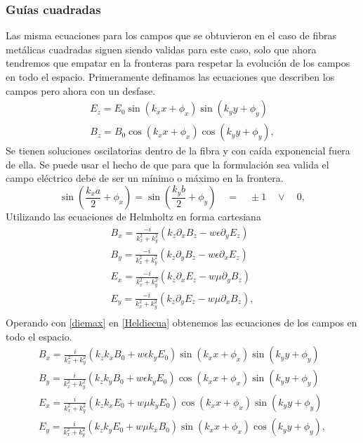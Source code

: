 \subsubsection{Guías cuadradas}
Las misma ecuaciones para los campos que se obtuvieron en el caso de fibras metálicas cuadradas siguen siendo validas para este caso, solo que ahora tendremos que empatar en la fronteras para respetar la evolución de los campos en todo el espacio. Primeramente definamos las ecuaciones que describen los campos pero ahora con un desfase.
\begin{eqnarray}\label{diemax}
E_{z}=E_{0} \sin(k_{x}x+\phi_{x}) \sin(k_{y}y+\phi_{y}) \\
B_{z}=B_{0} \cos(k_{x}x+\phi_{x}) \cos(k_{y}y+\phi_{y}) ,
\end{eqnarray}
Se tienen soluciones oscilatorias dentro de la fibra y con caída exponencial fuera de ella. Se puede usar el hecho de que para que la formulación sea valida el campo eléctrico debe de ser un mínimo o máximo en la frontera.
\begin{equation}
	\sin(\frac{k_{x}a}{2}+\phi_{x})=\sin(\frac{k_{y}b}{2}+\phi_{y}) \quad = \quad \pm 1 \quad \vee \quad 0 ,
\end{equation}
Utilizando las ecuaciones de Helmholtz en forma cartesiana
\begin{eqnarray} \label{Heldiecua}
B_{x}=\frac{-i}{k_{x}^2+k_{y}^2}(k_{z}\partial_{x}B_{z}-w \epsilon \partial_{y}E_{z}) \\
B_{y}=\frac{-i}{k_{x}^2+k_{y}^2}(k_{z}\partial_{y}B_{z}-w \epsilon \partial_{x}E_{z}) \\
E_{x}=\frac{-i}{k_{x}^2+k_{y}^2}(k_{z}\partial_{x}E_{z}-w \mu \partial_{y}B_{z}) \\
E_{y}=\frac{-i}{k_{x}^2+k_{y}^2}(k_{z}\partial_{y}E_{z}-w \mu \partial_{x}B_{z}) , \\
\end{eqnarray}
Operando con \ref{diemax} en \ref{Heldiecua} obtenemos las ecuaciones de los campos en todo el espacio.
\begin{eqnarray}
B_{x}=\frac{i}{k_{x}^2+k_{y}^2}(k_{z}k_{x}B_{0}+w\epsilon k_{y}E_{0})\sin(k_{x}x+\phi_{x})\sin(k_{y}y+\phi_{y})\\
B_{y}=\frac{i}{k_{x}^2+k_{y}^2}(k_{z}k_{y}B_{0}+w\epsilon k_{y}E_{0})\cos(k_{x}x+\phi_{x})\sin(k_{y}y+\phi_{y})\\
E_{x}=\frac{i}{k_{x}^2+k_{y}^2}(k_{z}k_{x}E_{0}+w\mu k_{y}E_{0})\cos(k_{x}x+\phi_{x})\sin(k_{y}y+\phi_{y})\\
E_{y}=\frac{i}{k_{x}^2+k_{y}^2}(k_{z}k_{y}E_{0}+w\mu k_{x}B_{0})\sin(k_{x}x+\phi_{x})\cos(k_{y}y+\phi_{y}),\\
\end{eqnarray}
